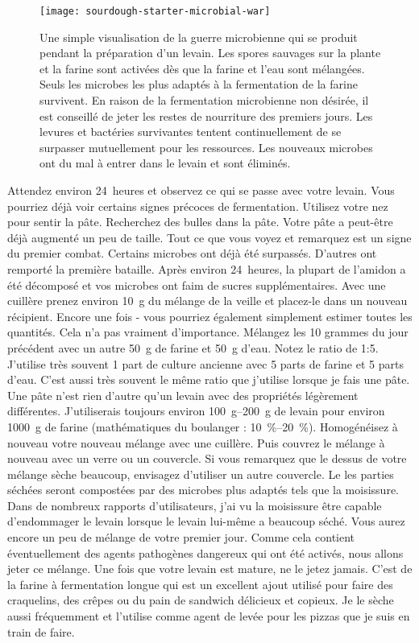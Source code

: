 \begin{figure}[!htb]
  \texttt{[image: sourdough-starter-microbial-war]}
  \caption[Microbial warfare during sourdough early days]{Une simple
      visualisation de la guerre microbienne qui se produit pendant la préparation d'un
      levain. Les spores sauvages sur la plante et la farine sont
      activées dès que la farine et l'eau sont mélangées. Seuls les microbes
      les plus adaptés à la fermentation de la farine survivent. En raison de la fermentation microbienne non désirée, il est conseillé de jeter les restes de nourriture des premiers
      jours. Les levures et bactéries survivantes tentent continuellement de se surpasser mutuellement pour les ressources. Les nouveaux microbes ont du mal à entrer dans le
      levain et sont éliminés.}%
  \label{fig:sourdough-starter-microbial-war}
\end{figure}Attendez environ 24~heures et observez ce qui se passe avec votre levain.
Vous pourriez déjà voir certains signes précoces de fermentation. Utilisez votre nez
pour sentir la pâte. Recherchez des bulles dans la pâte. Votre pâte
a peut-être déjà augmenté un peu de taille. Tout ce que
vous voyez et remarquez est un signe du premier combat. Certains microbes
ont déjà été surpassés. D'autres ont remporté la première bataille.
Après environ 24~heures, la plupart de l'amidon a été décomposé
et vos microbes ont faim de sucres supplémentaires. Avec une cuillère
prenez environ \qty{10}{\gram} du mélange de la veille et placez-le
dans un nouveau récipient. Encore une fois - vous pourriez également simplement estimer
toutes les quantités. Cela n'a pas vraiment d'importance. Mélangez les 10
grammes du jour précédent avec un autre \qty{50}{\gram} de farine
et \qty{50}{\gram} d'eau. Notez le ratio de 1:5. J'utilise très souvent
1 part de culture ancienne avec 5 parts de farine et 5 parts d'eau.
C'est aussi très souvent le même ratio que j'utilise lorsque je fais une pâte.
Une pâte n'est rien d'autre qu'un levain avec des propriétés légèrement différentes.
J'utiliserais toujours environ \qtyrange{100}{200}{\gram} de levain
pour environ \qty{1000}{\gram} de farine (mathématiques du boulanger : \qtyrange{10}{20}{\percent}).
Homogénéisez à nouveau votre nouveau mélange avec une cuillère. Puis couvrez
le mélange à nouveau avec un verre ou un couvercle. Si vous remarquez que le dessus de
votre mélange sèche beaucoup, envisagez d'utiliser un autre couvercle. Le
les parties séchées seront compostées par des microbes plus adaptés tels que
la moisissure. Dans de nombreux rapports d'utilisateurs, j'ai vu la moisissure être capable d'endommager
le levain lorsque le levain lui-même a beaucoup séché. Vous aurez
encore un peu de mélange de votre premier jour. Comme cela contient
éventuellement des agents pathogènes dangereux qui ont été activés, nous allons jeter
ce mélange. Une fois que votre levain est mature, ne le jetez jamais.
C'est de la farine à fermentation longue qui est un excellent ajout
utilisé pour faire des craquelins, des crêpes ou du pain de sandwich délicieux et copieux.
Je le sèche aussi fréquemment et l'utilise comme agent de levée
pour les pizzas que je suis en train de faire.

